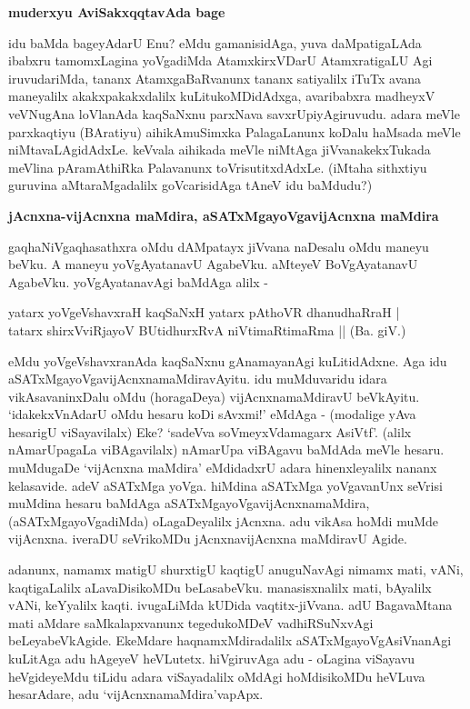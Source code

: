 {\bigskip
\noindent
{\large\bf muderxyu AviSakxqqtavAda bage}}\label{page73}
\medskip

\noindent
idu baMda bageyAdarU Enu? eMdu gamanisidAga, yuva daMpatigaLAda ibabxru tamomxLagina yoVgadiMda AtamxkirxVDarU AtamxratigaLU Agi iruvudariMda, tananx AtamxgaBaRvanunx tananx satiyalilx iTuTx avana maneyalilx akakxpakakxdalilx kuLitukoMDidAdxga, avaribabxra madheyxV veVNugAna loVlanAda kaqSaNxnu parxNava savxrUpiyAgiruvudu. adara meVle parxkaqtiyu (BAratiyu) aihikAmuSimxka PalagaLanunx koDalu haMsada meVle niMtavaLAgidAdxLe. keVvala aihikada meVle niMtAga jiVvanakekxTukada meVlina pAramAthiRka Palavanunx toVrisutitxdAdxLe. (iMtaha sithxtiyu guruvina aMtaraMgadalilx goVcarisidAga tAneV idu baMdudu?)

{\bigskip
\noindent
{\large\bf jAcnxna-vijAcnxna maMdira, aSATxMgayoVgavijAcnxna maMdira}}\label{page73}
\medskip

\noindent
gaqhaNiVgaqhasathxra oMdu dAMpatayx jiVvana naDesalu oMdu maneyu beVku. A maneyu yoVgAya\-tanavU AgabeVku. aMteyeV BoVgAyatanavU AgabeVku. yoVgAyatanavAgi baMdAga alilx -

\smallskip
\begin{shloka}
yatarx yoVgeVshavxraH kaqSaNxH yatarx pAthoVR dhanudhaRraH |\\\label{73}
tatarx shirxVviRjayoV BUtidhurxRvA niVtimaRtimaRma || \hfill{(Ba. giV.)}
\end{shloka}
\smallskip

eMdu yoVgeVshavxranAda kaqSaNxnu gAnamayanAgi kuLitidAdxne. Aga idu aSATxMgayoVgavijAcnxnamaMdiravAyitu. idu muMduvaridu idara vikAsavaninxDalu oMdu (horagaDeya) vijAcnxnamaMdiravU beVkAyitu. `idakekxVnAdarU oMdu hesaru koDi sAvxmi!' eMdAga - (modalige yAva hesarigU viSayavilalx) Eke? `sadeVva soVmeyxVdamagarx AsiVtf'\label{74}. (alilx nAmarUpagaLa viBAgavilalx) nAmarUpa viBAgavu baMdAda meVle hesaru. muMdugaDe `vijAcnxna maMdira' eMdidadxrU adara hinenxle\-yalilx nananx kelasavide. adeV aSATxMga yoVga. hiMdina aSATxMga yoVgavanUnx seVrisi muMdina hesaru baMdAga aSATxMgayoVgavijAcnxnamaMdira, (aSATxMgayoVgadiMda) oLagaDeyalilx jAcnxna. adu vikAsa hoMdi muMde vijAcnxna. iveraDU seVrikoMDu jAcnxnavijAcnxna maMdiravU Agide.

adanunx, namamx matigU shurxtigU kaqtigU anuguNavAgi nimamx mati, vANi, kaqtigaLalilx aLa\-vaDisi\-koMDu beLasabeVku. manasisxnalilx mati, bAyalilx vANi, keYyalilx kaqti. ivugaLiMda kUDida vaqtitx-jiVvana. adU BagavaMtana mati aMdare saMkalapxvanunx tegedukoMDeV vadhiRSuNxvAgi beLeyabeVkAgide. EkeM\-dare haqnamxM\-diradalilx aSATxMgayoVgAsiVnanAgi kuLitAga adu hAgeyeV heVLutetx. hiVgiruvAga adu - oLagina viSayavu heVgideyeMdu tiLidu adara viSayadalilx oMdAgi hoMdisikoMDu heVLuva hesarAdare, adu `vijAcnxnamaMdira'vapApx.

